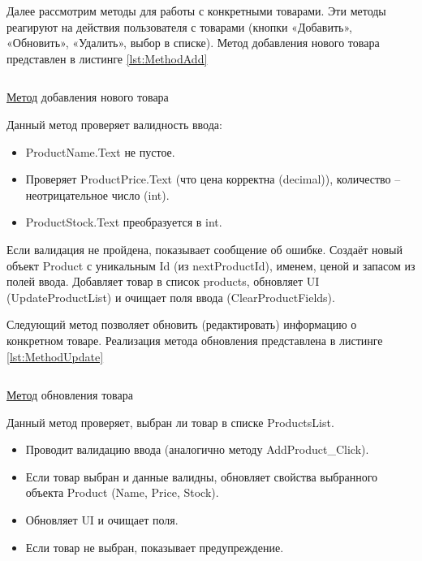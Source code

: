 \documentclass[12pt]{article}
\newcommand{\colorGIT}[1]{\textcolor{CtpLavender}{#1}}
\renewcommand{\texttt}[1]{{\small\ttfamily #1}}
\begin{document}
{}

Далее рассмотрим методы для работы с конкретными товарами. Эти методы реагируют на действия пользователя с товарами (кнопки «Добавить», «Обновить», «Удалить», выбор в списке). Метод добавления нового товара представлен в листинге \ref{lst:MethodAdd}

\begin{listing}[H]
	\inputminted[firstline=53, lastline=80]{csharp}{../../3lab/StoreManager/MainWindow.xaml.cs}
	\caption{\colorGIT{\href{https://github.com/WebMasterIT/Csharp_Labs/blob/ec375afd16c0647b337cf3d8a79c8bef904fc1be/3lab/StoreManager/MainWindow.xaml.cs\#L53-L80}{Метод}} добавления нового товара}
	\label{lst:MethodAdd}
\end{listing}

\noindent Данный метод проверяет валидность ввода:
\begin{itemize}
	\item \texttt{ProductName.Text} не пустое.
	\item Проверяет \texttt{ProductPrice.Text} (что цена корректна (\texttt{decimal})), количество -- неотрицательное число (\texttt{int}).
	\item \texttt{ProductStock.Text} преобразуется в \texttt{int}.
\end{itemize}

Если валидация не пройдена, показывает сообщение об ошибке. Создаёт новый объект \texttt{Product} с уникальным \texttt{Id} (из \texttt{nextProductId}), именем, ценой и запасом из полей ввода. Добавляет товар в список \texttt{products}, обновляет \texttt{UI} (\texttt{Update\-ProductList}) и очищает поля ввода (\texttt{Clear\-ProductFields}).

Следующий метод позволяет обновить (редактировать) информацию о конкретном товаре. Реализация метода обновления представлена в листинге \ref{lst:MethodUpdate}

\begin{listing}[H]
	\inputminted[firstline=82, lastline=110]{csharp}{../../3lab/StoreManager/MainWindow.xaml.cs}
	\caption{\colorGIT{\href{https://github.com/WebMasterIT/Csharp_Labs/blob/ec375afd16c0647b337cf3d8a79c8bef904fc1be/3lab/StoreManager/MainWindow.xaml.cs\#L82-L110}{Метод}} обновления товара}
	\label{lst:MethodUpdate}
\end{listing}

\noindent Данный метод проверяет, выбран ли товар в списке \texttt{ProductsList}.
\begin{itemize}
	\item Проводит валидацию ввода (аналогично методу \texttt{AddProduct\_Click}).
	\item Если товар выбран и данные валидны, обновляет свойства выбранного объекта \texttt{Product} (\texttt{Name}, \texttt{Price}, \texttt{Stock}).
	\item Обновляет \texttt{UI} и очищает поля.
	\item Если товар не выбран, показывает предупреждение.
\end{itemize}
\end{document}
